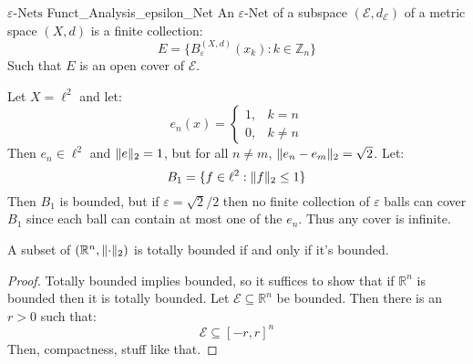         \begin{ldefinition}{$\varepsilon\textrm{-Nets}$}
              {Funct_Analysis_epsilon_Net}
            An $\varepsilon\textrm{-Net}$ of a subspace
            $(\mathcal{E},d_{\mathcal{E}})$ of a
            metric space $(X,d)$ is a finite collection:
            \begin{equation}
                E=\{B_{\varepsilon}^{(X,d)}(x_{k}):
                    k\in\mathbb{Z}_{n}\}
            \end{equation}
            Such that $E$ is an open cover of $\mathcal{E}$.
        \end{ldefinition}
        \begin{lexample}
            Let $X=\ell^{2}$ and let:
            \begin{equation}
                e_{n}(x)=
                \begin{cases}
                    1,&k=n\\
                    0,&k\ne{n}
                \end{cases}
            \end{equation}
            Then $e_{n}\in\ell^{2}$ and $\lVert e\rVert_{2}=1$,
            but for all $n\ne{m}$,
            $\lVert e_{n}-e_{m}\rVert_{2}=\sqrt{2}$. Let:
            \begin{equation}
                B_{1}=\{f\in\ell^{2}:\lVert f\rVert_{2}\leq{1}\}
            \end{equation}
            Then $B_{1}$ is bounded, but if
            $\varepsilon=\sqrt{2}/2$ then no finite collection
            of $\varepsilon$ balls can cover $B_{1}$ since
            each ball can contain at most one of the
            $e_{n}$. Thus any cover is infinite.
        \end{lexample}
        \begin{theorem}
            A subset of $(\mathbb{R}^{n},\lVert\cdot\rVert_{2})$
            is totally bounded if and only if it's bounded.
        \end{theorem}
        \begin{proof}
            Totally bounded implies bounded, so it suffices
            to show that if $\mathbb{R}^{n}$ is bounded then
            it is totally bounded. Let
            $\mathcal{E}\subseteq\mathbb{R}^{n}$ be bounded.
            Then there is an $r>0$ such that:
            \begin{equation}
                \mathcal{E}\subseteq[-r,r]^{n}
            \end{equation}
            Then, compactness, stuff like that.
        \end{proof}
